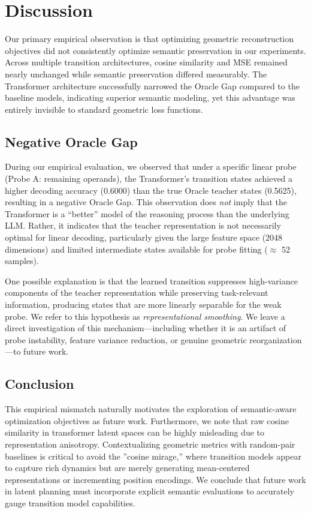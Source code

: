 \section{Discussion}

Our primary empirical observation is that optimizing geometric reconstruction objectives did not consistently optimize semantic preservation in our experiments. Across multiple transition architectures, cosine similarity and MSE remained nearly unchanged while semantic preservation differed measurably. The Transformer architecture successfully narrowed the Oracle Gap compared to the baseline models, indicating superior semantic modeling, yet this advantage was entirely invisible to standard geometric loss functions.

\subsection*{Negative Oracle Gap}

During our empirical evaluation, we observed that under a specific linear probe (Probe A: remaining operands), the Transformer's transition states achieved a higher decoding accuracy (0.6000) than the true Oracle teacher states (0.5625), resulting in a negative Oracle Gap. This observation does \textit{not} imply that the Transformer is a ``better'' model of the reasoning process than the underlying LLM. Rather, it indicates that the teacher representation is not necessarily optimal for linear decoding, particularly given the large feature space (2048 dimensions) and limited intermediate states available for probe fitting ($\approx$ 52 samples). 

One possible explanation is that the learned transition suppresses high-variance components of the teacher representation while preserving task-relevant information, producing states that are more linearly separable for the weak probe. We refer to this hypothesis as \textit{representational smoothing}. We leave a direct investigation of this mechanism---including whether it is an artifact of probe instability, feature variance reduction, or genuine geometric reorganization---to future work.

\subsection*{Conclusion}

This empirical mismatch naturally motivates the exploration of semantic-aware optimization objectives as future work. Furthermore, we note that raw cosine similarity in transformer latent spaces can be highly misleading due to representation anisotropy. Contextualizing geometric metrics with random-pair baselines is critical to avoid the ''cosine mirage,'' where transition models appear to capture rich dynamics but are merely generating mean-centered representations or incrementing position encodings. We conclude that future work in latent planning must incorporate explicit semantic evaluations to accurately gauge transition model capabilities.
